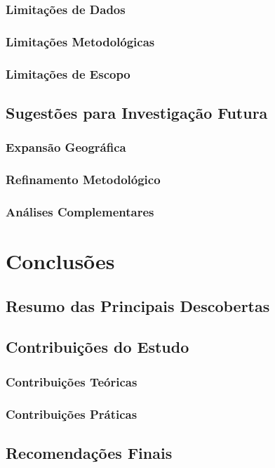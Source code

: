 \documentclass[12pt, a4paper]{article}
\begin{document}
\subsubsection{Limitações de Dados}
\subsubsection{Limitações Metodológicas}
\subsubsection{Limitações de Escopo}

\subsection{Sugestões para Investigação Futura}
\subsubsection{Expansão Geográfica}
\subsubsection{Refinamento Metodológico}
\subsubsection{Análises Complementares}

\section{Conclusões}
\subsection{Resumo das Principais Descobertas}
\subsection{Contribuições do Estudo}
\subsubsection{Contribuições Teóricas}
\subsubsection{Contribuições Práticas}

\subsection{Recomendações Finais}
\end{document}
